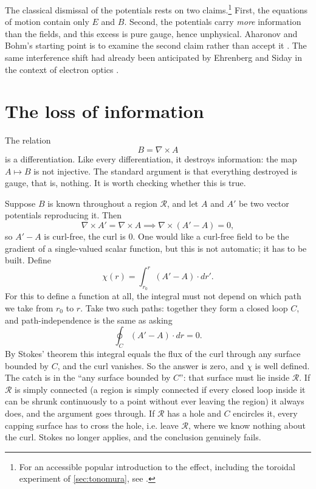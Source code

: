 The classical dismissal of the potentials rests on two claims.\footnote{For an
	accessible popular introduction to the effect, including the toroidal
	experiment of \cref{sec:tonomura}, see \cite{veritasiumTinyDonutThat2026}.}
First,
the equations of motion contain only \(E\) and \(B\). Second, the potentials
carry \emph{more} information than the fields, and this excess is pure gauge,
hence unphysical. Aharonov and Bohm's starting point is to examine
the second claim rather than accept it \cite{aharonovSignificanceElectromagneticPotentials1959}.
The same interference shift had already been anticipated by Ehrenberg and
Siday in the context of electron optics \cite{ehrenbergRefractiveIndexElectron1949}.


\begingroup
\renewcommand{\needspace}[1]{}
\section{The loss of information}
\label{sec:lost-information}
\endgroup
The relation
\[
	B = \nabla \times A
\]
is a differentiation. Like every differentiation, it destroys information:
the map \(A \longmapsto B\) is not injective. The standard argument is that
everything destroyed is gauge, that is, nothing. It is worth
checking whether this is true.

Suppose \(B\) is known throughout a region \(\mathcal R\), and let
\(A\) and \(A'\) be two vector potentials reproducing it. Then
\[
	\nabla \times A' = \nabla \times A \implies
	\nabla \times (A' - A) = 0,
\]
so \(A' - A\) is curl-free, the curl is \(0\).
One would like a curl-free field to be the gradient of a single-valued scalar function,
but this is not automatic; it has to be built. Define
\[
	\chi(r) = \int_{r_0}^r (A' - A) \cdot dr'.
\]
For this to define a function at all, the integral must not depend
on which path we take from \(r_0\) to \(r\). Take two such paths:
together they form a closed loop \(C\), and path-independence is the
same as asking
\[
	\oint_C (A' - A) \cdot dr = 0.
\]
By Stokes' theorem this integral equals the flux of the curl through any
surface bounded by \(C\), and the curl vanishes. So the answer is zero,
and \(\chi\) is well defined. The catch is in the ``any surface bounded
by \(C\)'': that surface must lie inside \(\mathcal{R}\). If \(\mathcal{R}\)
is simply connected (a region is simply connected if every closed loop
inside it can be shrunk continuously to a point without ever leaving the
region) it always does, and the argument goes through. If \(\mathcal{R}\)
has a hole and \(C\) encircles it, every capping surface has to cross the
hole, i.e. leave \(\mathcal{R}\), where we know nothing about the curl.
Stokes no longer applies, and the conclusion genuinely fails.

